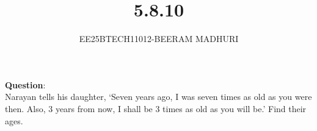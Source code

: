 \documentclass[journal]{IEEEtran}
\begin{document}

\vspace{3cm}

\title{5.8.10}
\author{EE25BTECH11012-BEERAM MADHURI}
{\let\newpage\relax\maketitle}

\renewcommand{\thefigure}{\theenumi}
\renewcommand{\thetable}{\theenumi}
\setlength{\intextsep}{10pt} %


\renewcommand{\thetable}{\theenumi}


\textbf{Question}:\\
Narayan tells his daughter, `Seven years ago, I was seven times as old as you were then. Also, 3 years from now, I shall be 3 times as old as you will be.' Find their ages.
\end{document}
